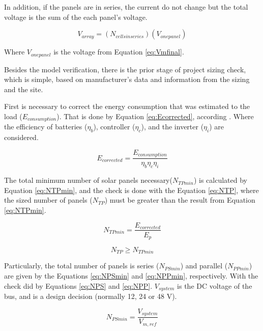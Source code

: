 In addition, if the panels are in series, the current do not change but the total voltage is the sum of the each panel's voltage.

\begin{equation}
\label{eq:Varray}
V_{array} = (N_{cells in series})(V_{one panel})
\end{equation}

Where $ V_{one panel} $ is the voltage from Equation \ref{eq:Vmfinal}.

Besides the model verification, there is the prior stage of project sizing check, which is simple, based on manufacturer's data and information from the sizing and the site. 

First is necessary to correct the energy consumption that was estimated to the load ($E_{consumption}$). That is done by Equation \ref{eq:Ecorrected}, according \cite{Pinho}. Where the efficiency of batteries ($\eta_{b}$), controller ($\eta_{c}$), and the inverter ($\eta_{i}$) are considered.

\begin{equation}
\label{eq:Ecorrected}
E_{corrected} = \dfrac{E_{consumption}}{ \eta_{b} \eta_{c} \eta_{i} }
\end{equation}

The total minimum number of solar panels necessary($ N_{TPmin} $) is calculated by Equation \ref{eq:NTPmin}, and the check is done with the Equation \ref{eq:NTP}, where the sized number of panels ($ N_{TP} $) must be greater than the result from Equation \ref{eq:NTPmin}.

\begin{equation}
\label{eq:NTPmin}
N_{TPmin} = \dfrac{E_{corrected}}{E_{p}}
\end{equation}

\begin{equation}
\label{eq:NTP}
N_{TP} \geq N_{TPmin}
\end{equation}

Particularly, the total number of panels is series ($ N_{PSmin} $) and parallel ($ N_{PPmin} $) are given by the Equations \ref{eq:NPSmin} and \ref{eq:NPPmin}, respectively. With the check did by Equations \ref{eq:NPS} and \ref{eq:NPP}. $ V_{system} $ is the DC voltage of the bus, and is a design decision (normally 12, 24 or 48 V).

\begin{equation}
\label{eq:NPSmin}
N_{PSmin} = \dfrac{V_{system}}{V_{m,ref}}
\end{equation}

